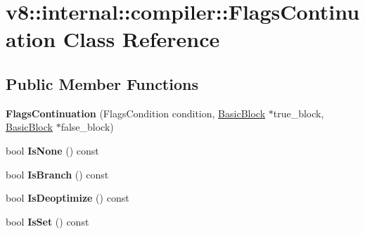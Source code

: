 \hypertarget{classv8_1_1internal_1_1compiler_1_1_flags_continuation}{}\section{v8\+:\+:internal\+:\+:compiler\+:\+:Flags\+Continuation Class Reference}
\label{classv8_1_1internal_1_1compiler_1_1_flags_continuation}
\subsection*{Public Member Functions}
\begin{DoxyCompactItemize}
\item 
{\bfseries Flags\+Continuation} (Flags\+Condition condition, \hyperlink{classv8_1_1internal_1_1compiler_1_1_basic_block}{Basic\+Block} $\ast$true\+\_\+block, \hyperlink{classv8_1_1internal_1_1compiler_1_1_basic_block}{Basic\+Block} $\ast$false\+\_\+block)\hypertarget{classv8_1_1internal_1_1compiler_1_1_flags_continuation_ae6aabeb12cdd2632f8527ef94ae99cef}{}\label{classv8_1_1internal_1_1compiler_1_1_flags_continuation_ae6aabeb12cdd2632f8527ef94ae99cef}

\item 
bool {\bfseries Is\+None} () const \hypertarget{classv8_1_1internal_1_1compiler_1_1_flags_continuation_a18570313abfba2d3cd1694c5d032867a}{}\label{classv8_1_1internal_1_1compiler_1_1_flags_continuation_a18570313abfba2d3cd1694c5d032867a}

\item 
bool {\bfseries Is\+Branch} () const \hypertarget{classv8_1_1internal_1_1compiler_1_1_flags_continuation_a1e933cbdbc4763199f804f290a05c12b}{}\label{classv8_1_1internal_1_1compiler_1_1_flags_continuation_a1e933cbdbc4763199f804f290a05c12b}

\item 
bool {\bfseries Is\+Deoptimize} () const \hypertarget{classv8_1_1internal_1_1compiler_1_1_flags_continuation_a8658ba9c68337211a8e0868c3aa78724}{}\label{classv8_1_1internal_1_1compiler_1_1_flags_continuation_a8658ba9c68337211a8e0868c3aa78724}

\item 
bool {\bfseries Is\+Set} () const \hypertarget{classv8_1_1internal_1_1compiler_1_1_flags_continuation_a647ce9edfab4c5edf5977bbd66b83ac1}{}\label{classv8_1_1internal_1_1compiler_1_1_flags_continuation_a647ce9edfab4c5edf5977bbd66b83ac1}


\end{DoxyCompactItemize}
